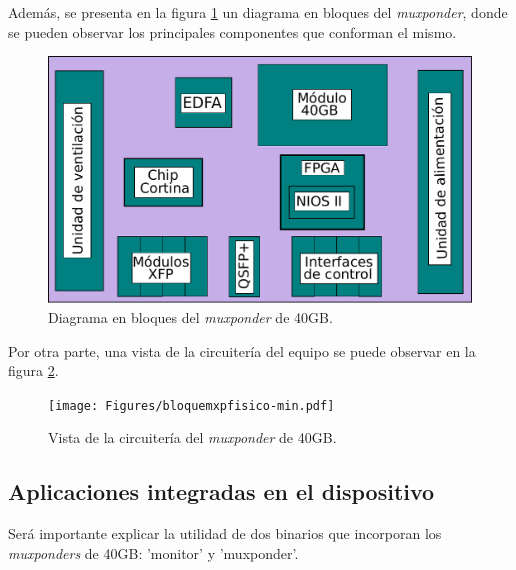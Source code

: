 Además, se presenta en la figura \ref{fig:diagramabloque} un diagrama en bloques del \textit{muxponder}, donde se pueden observar los principales componentes que conforman el mismo.

\begin{figure}[H]
	\centering
	\includegraphics[scale=0.60]{Figures/diagramabloquesmxp.pdf}
	\caption{Diagrama en bloques del \textit{muxponder} de 40GB.}
	\label{fig:diagramabloque}
  \end{figure}

Por otra parte, una vista de la circuitería del equipo se puede observar en la figura \ref{fig:diagramabloquemxp}.

\begin{figure}[H]
	\centering
	\texttt{[image: Figures/bloquemxpfisico-min.pdf]}
	\caption{Vista de la circuitería del \textit{muxponder} de 40GB.}
	\label{fig:diagramabloquemxp}
  \end{figure}

\subsection{Aplicaciones integradas en el dispositivo}

Será importante explicar la utilidad de dos binarios que incorporan los \textit{muxponders} de 40GB: 'monitor' y 'muxponder'. 

